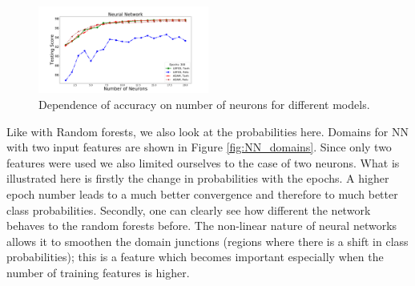 

\begin{figure}[h]
\hspace*{-0.5cm}
\includegraphics[width=0.5\textwidth]{plots/nn_neurons_300epochs.pdf}
\caption{Dependence of accuracy on number of neurons for different models.}
\label{fig:NN_neurons}
\end{figure}

Like with Random forests, we also look at the probabilities here. Domains for NN with two input features are shown in Figure \ref{fig:NN_domains}. Since only two features were used we also limited ourselves to the case of two neurons. What is illustrated here is firstly the change in probabilities with the epochs. A higher epoch number leads to a much better convergence and therefore to much better class probabilities. Secondly, one can clearly see how different the network behaves to the random forests before. The non-linear nature of neural networks allows it to smoothen the domain junctions (regions where there is a shift in class probabilities); this is a feature which becomes important especially when the number of training features is higher.


